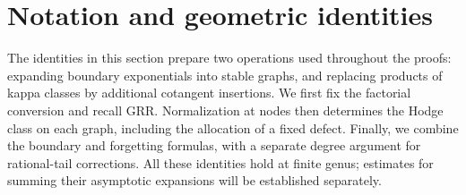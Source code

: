 \section{Notation and geometric identities}
\label{sec:s02}

The identities in this section prepare two operations used throughout
the proofs: expanding boundary exponentials into stable graphs, and
replacing products of kappa classes by additional cotangent insertions.
We first fix the factorial conversion and recall GRR.  Normalization at
nodes then determines the Hodge class on each graph, including the
allocation of a fixed defect.  Finally, we combine the boundary and
forgetting formulas, with a separate degree argument for rational-tail
corrections.  All these identities hold at finite genus; estimates for
summing their asymptotic expansions will be established separately.





